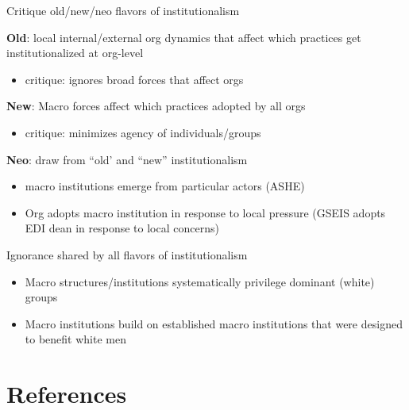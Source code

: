 \begin{frame}{Critique old/new/neo flavors of institutionalism}

	\textbf{Old}: local internal/external org dynamics that affect which practices get institutionalized at org-level
	\begin{itemize}
		\item critique: ignores broad forces that affect orgs
	\end{itemize}		
	\textbf{New}: Macro forces affect which practices adopted by all orgs
	\begin{itemize}
		\item critique: minimizes agency of individuals/groups
	\end{itemize}
	\textbf{Neo}: draw from ``old' and ``new'' institutionalism
	\begin{itemize}
		\item macro institutions emerge from particular actors (ASHE)
		\item Org adopts macro institution in response to local pressure (GSEIS adopts EDI dean in response to local concerns)
	\end{itemize}


	\vspace{3mm}
	Ignorance shared by all flavors of institutionalism
	\begin{itemize}
		\item Macro structures/institutions systematically privilege dominant (white) groups 
		\item Macro institutions build on established macro institutions that were designed to benefit white men
	\end{itemize}
	
\end{frame}



\section{References}

